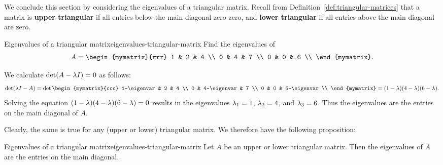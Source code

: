 We conclude this section by considering the eigenvalues of a
triangular matrix. Recall from
Definition~\ref{def:triangular-matrices} that a matrix is
\textbf{upper triangular}%
%
%
%
%
if all entries below the main diagonal zero
zero, and \textbf{lower triangular}%
%
if all entries above the main
diagonal are zero.

\begin{example}{Eigenvalues of a triangular matrix}{eigenvalues-triangular-matrix}
  Find the eigenvalues of
  \begin{equation*}
    A=\begin{mymatrix}{rrr}
      1 & 2 & 4 \\
      0 & 4 & 7 \\
      0 & 0 & 6 \\
    \end{mymatrix}.
  \end{equation*}
\end{example}

\begin{solution}
  We calculate $\det(A - \lambda I) = 0$ as follows:
  \begin{eqnarray*}
    \det (\eigenvar I - A) =
    \det \begin{mymatrix}{ccc}
      1-\eigenvar & 2 & 4 \\
      0 & 4-\eigenvar & 7 \\
      0 & 0 & 6-\eigenvar \\
    \end{mymatrix} = (1-\eigenvar)(4-\eigenvar)(6-\eigenvar).
  \end{eqnarray*}
  Solving the equation $(1-\lambda)(4-\lambda)(6-\lambda) = 0$
  results in the eigenvalues $\lambda_1 = 1$, $\lambda_2 = 4$, and
  $\lambda_3 = 6$.  Thus the eigenvalues are the entries on the main
  diagonal of $A$.
\end{solution}

Clearly, the same is true for any (upper or lower) triangular
matrix. We therefore have the following proposition:

\begin{proposition}{Eigenvalues of a triangular matrix}{eigenvalues-triangular-matrix}
  Let $A$ be an upper or lower triangular matrix. Then the eigenvalues
  of $A$ are the entries on the main diagonal.
\end{proposition}
